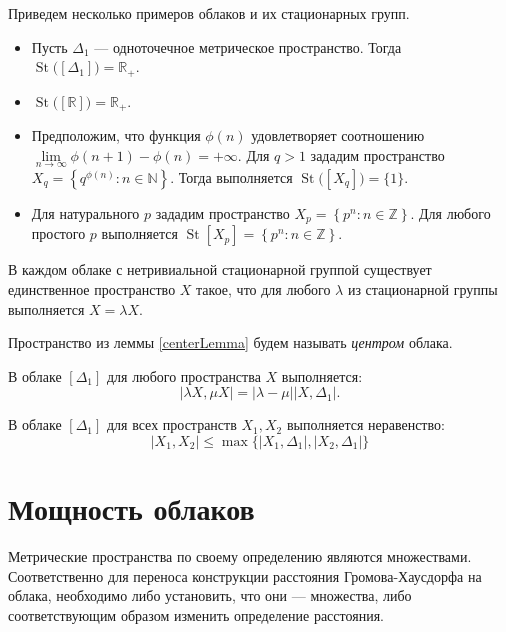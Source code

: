 \documentclass[11pt,twoside,draft
]{article}
\DeclareMathOperator{\St}{St}
\begin{document}
Приведем несколько примеров облаков и их стационарных групп.

\begin{itemize}
	\item Пусть $\Delta_1$ --- одноточечное метрическое
	пространство.  Тогда\\ $\St\bigl([\Delta_1]\bigr) = \mathbb{R}_+$.
	\item $\St\bigl([\mathbb{R}]\bigr) = \mathbb{R}_+ $.
	\item Предположим, что функция $\phi(n)$ удовлетворяет соотношению $\lim\limits_{n \rightarrow \infty } \phi(n + 1) - \phi(n) = +\infty$. Для $q > 1$ зададим пространство $X_q = \left\{q^{\phi(n)}: n \in \mathbb{N}\right\}$. Тогда выполняется
	$\St\bigl(\left[X_q\right]\bigr) = \{1\}$\cite{TuzhBog1}.
	\item Для натурального $p$ зададим пространство $X_p = \left\{p^n:n \in \mathbb{Z}\right\}$.
	Для любого простого $p$ выполняется $\St\left[X_p\right] = \left\{p^n:n \in \mathbb{Z}\right\}$\cite{BogBog1}.
\end{itemize}
\begin{lemma}
	В каждом облаке с нетривиальной стационарной группой существует единственное
	пространство $X$ такое, что для любого $\lambda$ из стационарной группы
	выполняется $X = \lambda X$.
	\label{centerLemma}
\end{lemma}
\begin{defin}
	Пространство из леммы \ref{centerLemma} будем называть \emph{центром} облака.
\end{defin}
\begin{remark} В
	облаке $[\Delta_1]$ для любого пространства $X$ выполняется:
	$$|\lambda X, \mu X| = |\lambda - \mu||X,\Delta_1|.$$
\end{remark} \begin{remark} В облаке
	$[\Delta_{1}]$ для всех пространств $X_{1}, X_{2}$ выполняется неравенство:
	$$|X_{1},X_{2}| \le \max\{|X_{1}, \Delta_{1}|,|X_{2},\Delta_{1}|\}$$
	\label{remUltraMetric}
\end{remark}


\section{Мощность облаков}
Метрические пространства по своему определению являются множествами.
Соответственно для переноса конструкции расстояния Громова-Хаусдорфа на облака,
необходимо либо установить, что они --- множества, либо соответствующим
образом изменить определение расстояния.
\end{document}
